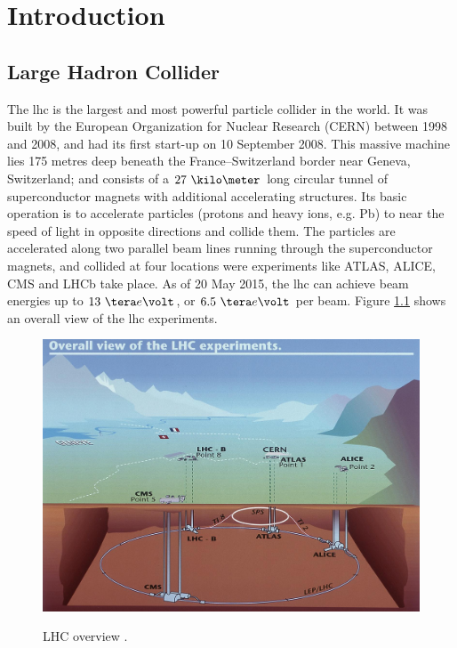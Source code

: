 \documentclass[main.tex]{subfiles}
\begin{document}
\chapter{Introduction}

\section{Large Hadron Collider}

The \gls{lhc} is the largest and most powerful particle collider in the world. It was built by the European Organization for Nuclear Research (CERN) \cite{cernweb} between 1998 and 2008, and had its first start-up on 10 September 2008. This massive machine lies 175 metres deep beneath the France–Switzerland border near Geneva, Switzerland; and consists of a $27~\kilo\meter$ long circular tunnel of superconductor magnets with additional accelerating structures. Its basic operation is to accelerate particles (protons and heavy ions, e.g. Pb) to near the speed of light in opposite directions and collide them. The particles are accelerated along two parallel beam lines running through the superconductor magnets, and collided at four locations were experiments like ATLAS\cite{atlasweb}, ALICE\cite{aliceweb}, CMS\cite{cmsweb} and LHCb\cite{lhcbweb} take place. As of 20 May 2015, the \gls{lhc} can achieve beam energies up to $13~\tera e\volt$, or $6.5~\tera e\volt$ per beam. Figure \ref{fig:lhcov} shows an overall view of the \gls{lhc} experiments.

\begin{figure} %
\includegraphics[width=0.7\linewidth]{../img/lhc.jpg}  \\[0.1 cm]
\caption{LHC overview \cite{lhcpic}.}
\label{fig:lhcov}
\end{figure}
\end{document}
